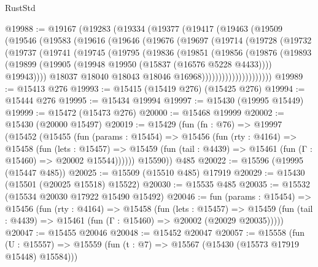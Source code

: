 \begin{lexlean}{RustStd}
\begin{coremodule}
@19988 := @19167
    (@19283
      (@19334
        (@19377
          (@19417
            (@19463
              (@19509
                (@19546
                  (@19583
                    (@19616
                      (@19646
                        (@19676
                          (@19697
                            (@19714
                              (@19728
                                (@19732
                                  (@19737
                                    (@19741
                                      (@19745
                                        (@19795
                                          (@19836
                                            (@19851
                                              (@19856
                                                (@19876
                                                  (@19893
                                                    (@19899
                                                      (@19905
                                                        (@19948
                                                          @19950
                                                          (@15837 (@16576 @5228 @4433))))
                                                      @19943))))
                                              @18037
                                              @18040
                                              @18043
                                              @18046
                                              @16968)))))))))))))))))))))
@19989 := @15413 @276
@19993 := @15415 (@15419 @276) (@15425 @276)
@19994 := @15444 @276
@19995 := @15434 @19994
@19997 := @15430 (@19995 @15449)
@19999 := @15472 (@15473 @276)
@20000 := @15468 @19999
@20002 := @15430 (@20000 @15497)
@20019 := @15429
    (fun (fn : @76) =>
    @19997
      (@15452
        (@15455
          (fun (params : @15454) =>
          @15456
            (fun (rty : @4164) =>
            @15458
              (fun (lets : @15457) =>
              @15459 (fun (tail : @4439) => @15461 (fun (Γ : @15460) => @20002 @15544))))))
        @15590))
    @485
@20022 := @15596 (@19995 (@15447 @485))
@20025 := @15509 (@15510 @485) @17919
@20029 := @15430 (@15501 (@20025 @15518) @15522)
@20030 := @15535 @485
@20035 := @15532 (@15534 @20030 @17922 @15490 @15492)
@20046 := fun (params : @15454) =>
  @15456
    (fun (rty : @4164) =>
    @15458
      (fun (lets : @15457) =>
      @15459 (fun (tail : @4439) => @15461 (fun (Γ : @15460) => @20002 (@20029 @20035)))))
@20047 := @15455 @20046
@20048 := @15452 @20047
@20057 := @15558
    (fun (U : @15557) => @15559 (fun (t : @7) => @15567 (@15430 (@15573 @17919 @15448) @15584)))

\end{coremodule}
\end{lexlean}
